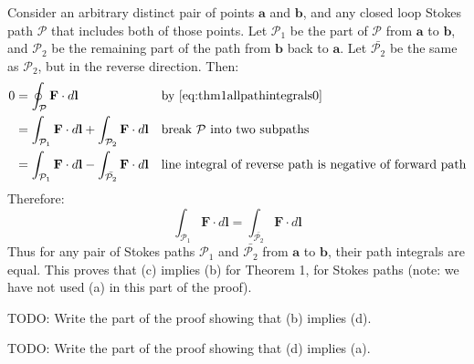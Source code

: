 \documentclass[a4paper]{article}
\theoremstyle{plain}
\theoremstyle{definition}
\newcommand{\vect}[1]{\textbf{#1}}
\begin{document}
Consider an arbitrary distinct pair of points $\vect{a}$ and
$\vect{b}$, and any closed loop Stokes path $\mathcal{P}$ that
includes both of those points.  Let $\mathcal{P}_1$ be the part of
$\mathcal{P}$ from $\vect{a}$ to $\vect{b}$, and $\mathcal{P}_2$ be
the remaining part of the path from $\vect{b}$ back to $\vect{a}$.
Let $\bar{\mathcal{P}_2}$ be the same as $\mathcal{P}_2$, but in the
reverse direction.  Then:
\begin{align}
  0
      & = \oint_{\mathcal{P}} \vect{F} \cdot d\vect{l} & & \text{by~\eqref{eq:thm1allpathintegrals0}} \nonumber \\
      & = \int_{\mathcal{P}_1} \vect{F} \cdot d\vect{l} + \int_{\mathcal{P}_2} \vect{F} \cdot d\vect{l} & & \text{break $\mathcal{P}$ into two subpaths} \nonumber \\
      & = \int_{\mathcal{P}_1} \vect{F} \cdot d\vect{l} - \int_{\bar{\mathcal{P}_2}} \vect{F} \cdot d\vect{l} & & \text{line integral of reverse path is negative of forward path} \nonumber
\end{align}
Therefore:
\begin{equation}
\int_{\mathcal{P}_1} \vect{F} \cdot d\vect{l} = \int_{\bar{\mathcal{P}_2}} \vect{F} \cdot d\vect{l}
\end{equation}
Thus for any pair of Stokes paths $\mathcal{P}_1$ and
$\bar{\mathcal{P}_2}$ from $\vect{a}$ to $\vect{b}$, their path
integrals are equal.
This proves that (c) implies (b) for Theorem 1, for Stokes paths
(note: we have not used (a) in this part of the proof).

TODO: Write the part of the proof showing that (b) implies (d).

TODO: Write the part of the proof showing that (d) implies (a).
\end{document}
